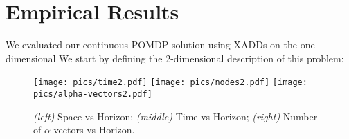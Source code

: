 \documentclass{article} %
\begin{document}
\section{Empirical Results}
We evaluated our continuous POMDP solution using XADDs on the one-dimensional
We start by defining the 2-dimensional description of this problem:
\begin{figure*}[tbp!]
\vspace{-2mm}
\centering
\texttt{[image: pics/time2.pdf]}
\texttt{[image: pics/nodes2.pdf]}
\texttt{[image: pics/alpha-vectors2.pdf]}
\vspace{-3mm}
\caption{\footnotesize 
{\it (left)} Space vs Horizon; 
{\it (middle)} Time vs Horizon; 
{\it (right)} Number of $\alpha$-vectors vs Horizon.
}
\label{fig:timeSpace}
\vspace{-4mm}
\end{figure*}
\end{document}
